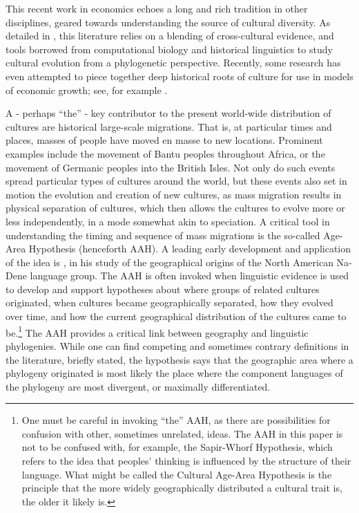 \documentclass[11pt]{article}
\begin{document}
This recent work in economics echoes a long and rich tradition in other disciplines, geared towards understanding the source of cultural diversity. As detailed in \cite{mace05}, this literature relies on a blending of cross-cultural evidence, and tools borrowed from computational biology and historical linguistics to study cultural evolution from a phylogenetic perspective. Recently, some research has even attempted to piece together deep historical roots of culture for use in models of economic growth; see, for example \cite{nunn17}.  

A - perhaps ``the'' - key contributor to the present world-wide distribution of cultures are historical large-scale migrations. That is, at particular times and places, masses of people have moved en masse to new locations. Prominent examples include the movement of Bantu peoples throughout Africa, or the movement of Germanic peoples into the British Isles. Not only do such events spread particular types of cultures around the world, but these events also set in motion the evolution and creation of new cultures, as mass migration results in physical separation of cultures, which then allows the cultures to evolve more or less independently, in a mode somewhat akin to speciation.  
A critical tool in understanding the timing and sequence of mass migrations is the so-called Age-Area Hypothesis (henceforth AAH). A leading early development and application of the idea is \cite{sapir16}, in his study of the geographical origins of the North American Na-Dene language group. The AAH is often invoked when linguistic evidence is used to develop and support hypotheses about where groups of related  cultures originated, when cultures became geographically separated, how they evolved over time, and how the current geographical distribution of the cultures came to be.\footnote{One must be careful in invoking ``the'' AAH, as there are possibilities for confusion with other, sometimes unrelated, ideas. The AAH in this paper is not to be confused with, for example, the Sapir-Whorf Hypothesis, which refers to the idea that peoples' thinking is influenced by the structure of their language. What might be called the Cultural Age-Area Hypothesis is the principle that the more widely geographically distributed a cultural trait is, the older it likely is. } The AAH provides a critical link between geography and linguistic phylogenies. While one can find competing and sometimes contrary definitions in the literature, briefly stated, the hypothesis says that the geographic area where a phylogeny originated is most likely the place where the component languages of the phylogeny are most divergent, or maximally differentiated.
\end{document}
